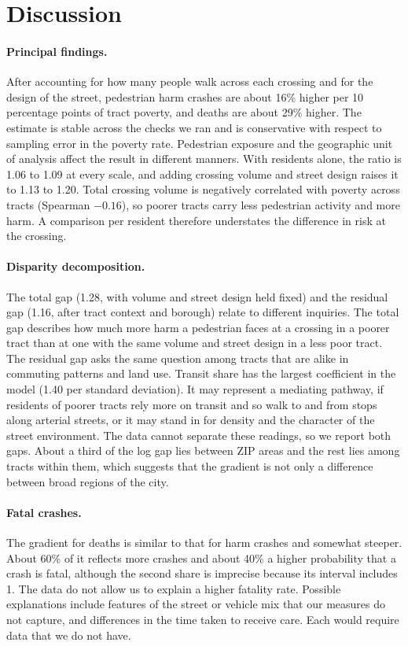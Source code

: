 \documentclass[10pt,twocolumn]{article}
\begin{document}
\section{Discussion}
\paragraph{Principal findings.} After accounting for how many people walk across each crossing and for the design of the street, pedestrian harm crashes are about 16\% higher per 10 percentage points of tract poverty, and deaths are about 29\% higher. The estimate is stable across the checks we ran and is conservative with respect to sampling error in the poverty rate. Pedestrian exposure and the geographic unit of analysis affect the result in different manners. With residents alone, the ratio is 1.06 to 1.09 at every scale, and adding crossing volume and street design raises it to 1.13 to 1.20. Total crossing volume is negatively correlated with poverty across tracts (Spearman $-0.16$), so poorer tracts carry less pedestrian activity and more harm. A comparison per resident therefore understates the difference in risk at the crossing.

\paragraph{Disparity decomposition.} The total gap (1.28, with volume and street design held fixed) and the residual gap (1.16, after tract context and borough) relate to different inquiries. The total gap describes how much more harm a pedestrian faces at a crossing in a poorer tract than at one with the same volume and street design in a less poor tract. The residual gap asks the same question among tracts that are alike in commuting patterns and land use. Transit share has the largest coefficient in the model (1.40 per standard deviation). It may represent a mediating pathway, if residents of poorer tracts rely more on transit and so walk to and from stops along arterial streets, or it may stand in for density and the character of the street environment. The data cannot separate these readings, so we report both gaps. About a third of the log gap lies between ZIP areas and the rest lies among tracts within them, which suggests that the gradient is not only a difference between broad regions of the city.

\paragraph{Fatal crashes.} The gradient for deaths is similar to that for harm crashes and somewhat steeper. About 60\% of it reflects more crashes and about 40\% a higher probability that a crash is fatal, although the second share is imprecise because its interval includes 1. The data do not allow us to explain a higher fatality rate. Possible explanations include features of the street or vehicle mix that our measures do not capture, and differences in the time taken to receive care. Each would require data that we do not have.
\end{document}

